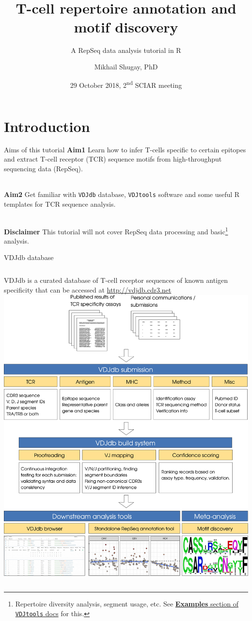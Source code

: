 \documentclass[12pt]{beamer}
\author{Mikhail Shugay, PhD}
\title{T-cell repertoire annotation and motif discovery}
\subtitle{A RepSeq data analysis tutorial in R}
\institute[Skoltech]{\texttt {Skolkovo Institute of Science and Technology}}
\date{29 October 2018, 2\textsuperscript{nd} SCIAR meeting}
\begin{document}
\maketitle

\section{Introduction}

\begin{frame}{Aims of this tutorial}
\textbf{Aim1} Learn how to infer T-cells specific to certain epitopes and extract T-cell receptor (TCR) sequence motifs from high-throughput sequencing data (RepSeq).\\~\

\textbf{Aim2} Get familiar with \texttt{VDJdb} database, \texttt{VDJtools} software and some useful R templates for TCR sequence analysis.\\~\

\textbf{Disclaimer} This tutorial will not cover RepSeq data processing and basic\footnote{Repertoire diversity analysis, segment usage, etc. See \href{https://vdjtools-doc.readthedocs.io/en/master/examples.html}{\textbf{Examples} section of \texttt{VDJtools} docs} for this.} analysis.
\end{frame}

\begin{frame}{VDJdb database}
\begin{columns}
VDJdb is a curated database of T-cell receptor sequences of known antigen specificity that can be accessed at \url{http://vdjdb.cdr3.net}
\includegraphics[width=\textwidth]{vdjdb_splash}
\end{columns}
\end{frame}
\end{document}
